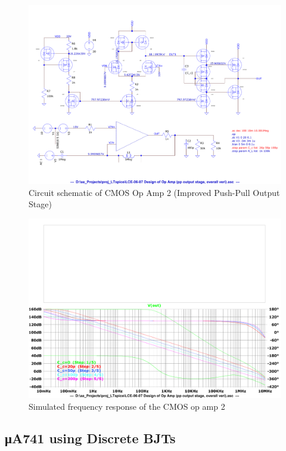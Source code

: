 \documentclass[UTF8]{article}
\begin{document}
\begin{figure}[H]\centering
    \includegraphics[width=\columnwidth]{assets/op amp 2/CMOS op amp 2 (PP).pdf}
    \caption{Circuit schematic of CMOS Op Amp 2 (Improved Push-Pull Output Stage)}
    \label{fig: CMOS Op Amp 2}
\end{figure}

\begin{figure}[H]\centering
    \includegraphics[width=\columnwidth]{assets/op amp 2/gain of CMOS op amp 2 copy.pdf}
    \caption{Simulated frequency response of the CMOS op amp 2}
\end{figure}

\subsection{μA741 using Discrete BJTs}
\end{document}
